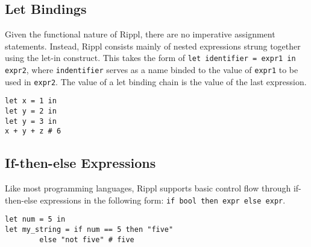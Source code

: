\documentclass[5pt]{article}
\begin{document}
\subsection{Let Bindings}
Given the functional nature of Rippl, there are no imperative assignment statements. Instead, Rippl consists mainly of nested expressions strung together
using the let-in construct. This takes the form of \texttt{let identifier = expr1 in expr2}, where \texttt{indentifier} serves as a name binded to the value of \texttt{expr1} to be used in \texttt{expr2}. The value of a let binding chain is the value of the last expression.
\begin{lstlisting}[language=rippl]
let x = 1 in 
let y = 2 in 
let y = 3 in
x + y + z # 6
\end{lstlisting}

\subsection{If-then-else Expressions}
Like most programming languages, Rippl supports basic control flow through if-then-else expressions in the following form:
\texttt{if bool then expr else expr}. %

\begin{lstlisting}[language=rippl]
let num = 5 in
let my_string = if num == 5 then "five" 
        else "not five" # five
\end{lstlisting}
\end{document}
